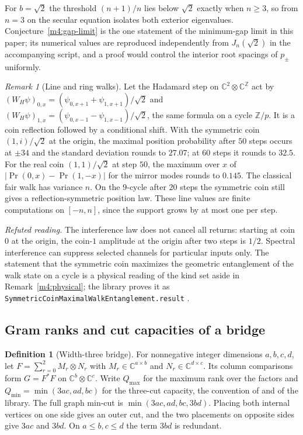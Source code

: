 \documentclass[11pt,reqno]{amsart}
\theoremstyle{definition}
\newtheorem{definition}[theorem]{Definition}
\theoremstyle{remark}
\newtheorem{remark}[theorem]{Remark}
\numberwithin{equation}{section}
\begin{document}
For $b=\sqrt2$ the threshold $(n+1)/n$ lies below $\sqrt2$ exactly when
$n\ge3$, so from $n=3$ on the secular equation isolates both exterior
eigenvalues. Conjecture~\ref{m4:gap-limit} is the one statement of the
minimum-gap limit in this paper; its numerical values are reproduced
independently from $J_n(\sqrt2)$ in the accompanying script, and a proof
would control the interior root spacings of $p_\pm$ uniformly.

\begin{remark}[Line and ring walks]\label{m11:walk-examples}\sloppy
Let the Hadamard step on $\mathbb C^2\otimes\mathbb C^{\mathbb Z}$ act by
$(W_H\psi)_{0,x}=(\psi_{0,x+1}+\psi_{1,x+1})/\sqrt2$ and
$(W_H\psi)_{1,x}=(\psi_{0,x-1}-\psi_{1,x-1})/\sqrt2$, the same formula on a
cycle $\mathbb Z/p$. It is a coin reflection followed by a conditional shift.
With the symmetric coin $(1,i)/\sqrt2$ at the origin, the maximal
position probability after $50$ steps occurs at $\pm34$ and the standard
deviation rounds to $27.07$; at $60$ steps it rounds to $32.5$.
For the real coin $(1,1)/\sqrt2$ at step $50$, the maximum over $x$ of
$|\Pr(0,x)-\Pr(1,-x)|$ for the mirror modes rounds to $0.145$. The
classical fair walk has variance $n$. On the $9$-cycle after $20$ steps
the symmetric coin still gives a reflection-symmetric position law.
These line values are finite computations on $[-n,n]$, since the support
grows by at most one per step.

\emph{Refuted reading.} The interference law does not cancel all
returns: starting at coin $0$ at the origin, the coin-$1$ amplitude at
the origin after two steps is $1/2$. Spectral interference can suppress
selected channels for particular inputs only. The statement that the
symmetric coin maximizes the geometric entanglement of the walk state on
a cycle is a physical reading of the kind set aside in
Remark~\ref{m4:physical}; the library proves it as
\texttt{SymmetricCoinMaximalWalkEntanglement}\allowbreak\texttt{.result} \cite{Tru}.
\end{remark}

\subsection{Gram ranks and cut capacities of a bridge}

\begin{definition}[Width-three bridge]\label{m11:bridge-def}
For nonnegative integer dimensions $a,b,c,d$, let
$F=\sum_{r=0}^2 M_r\otimes N_r$ with $M_r\in\mathbb C^{a\times b}$
and $N_r\in\mathbb C^{d\times c}$. Its column comparisons form
$G=F^*F$ on $\mathbb C^b\otimes\mathbb C^c$. Write
$Q_{\max}$ for the maximum rank over the factors and
$Q_{\min}=\min(3ac,ad,bc)$ for the three-cut capacity, the convention
of \cite{m11:GLS} and of the library.
The full graph min-cut is $\min(3ac,ad,bc,3bd)$.
Placing both internal vertices on one side gives an outer cut,
and the two placements on opposite sides give $3ac$ and $3bd$.
On $a\le b,c\le d$ the term $3bd$ is redundant.
\end{definition}
\end{document}
